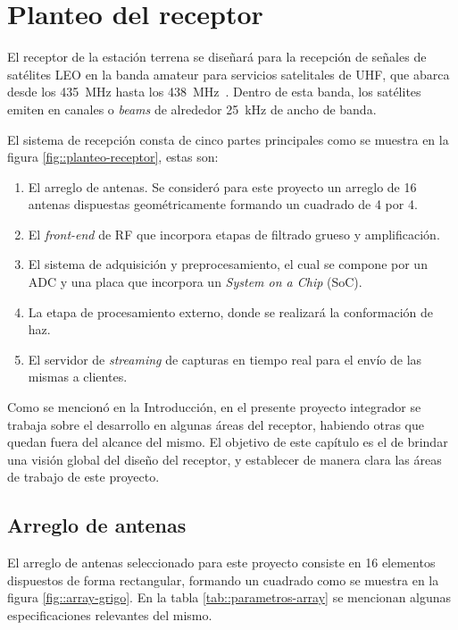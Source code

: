 \documentclass[../../main.tex]{subfiles}
\begin{document}
\graphicspath{{./figures}}
\chapter{Planteo del receptor}
El receptor de la estación terrena se diseñará para la recepción de señales de satélites LEO en la banda amateur para servicios satelitales de UHF, que abarca desde los 435~MHz hasta los 438~MHz~\cite[p. 17]{itu-banda-amateur}. Dentro de esta banda, los satélites emiten en canales o \textit{beams} de alrededor 25~kHz de ancho de banda. 

El sistema de recepción consta de cinco partes principales como se muestra en la figura \ref{fig::planteo-receptor}, estas son:

\begin{enumerate}
    \item El arreglo de antenas. Se consideró para este proyecto un arreglo de 16 antenas dispuestas geométricamente formando un cuadrado de 4 por 4.
    \item El \textit{front-end} de RF que incorpora etapas de filtrado grueso y amplificación.
    \item El sistema de adquisición y preprocesamiento, el cual se compone por un ADC y una placa que incorpora un \textit{System on a Chip} (SoC).
    \item La etapa de procesamiento externo, donde se realizará la conformación de haz.
    \item El servidor de \textit{streaming} de capturas en tiempo real para el envío de las mismas a clientes.
\end{enumerate} 

Como se mencionó en la Introducción, en el presente proyecto integrador se trabaja sobre el desarrollo en algunas áreas del receptor, habiendo otras que quedan fuera del alcance del mismo. El objetivo de este capítulo es el de brindar una visión global del diseño del receptor, y establecer de manera clara las áreas de trabajo de este proyecto.


\section{Arreglo de antenas}\label{sec::arreglo-de-antenas}
El arreglo de antenas seleccionado para este proyecto consiste en 16 elementos dispuestos de forma rectangular, formando un cuadrado como se muestra en la figura \ref{fig::array-grigo}.
En la tabla \ref{tab::parametros-array} se mencionan algunas especificaciones relevantes del mismo.
\end{document}
